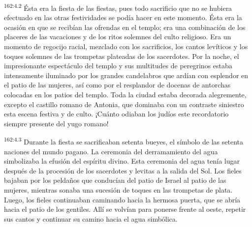 \par 
\textsuperscript{162:4.2} Ésta era la fiesta de las fiestas, pues todo sacrificio que no se hubiera efectuado en las otras festividades se podía hacer en este momento. Ésta era la ocasión en que se recibían las ofrendas en el templo; era una combinación de los placeres de las vacaciones y de los ritos solemnes del culto religioso. Era un momento de regocijo racial, mezclado con los sacrificios, los cantos levíticos y los toques solemnes de las trompetas plateadas de los sacerdotes. Por la noche, el impresionante espectáculo del templo y sus multitudes de peregrinos estaba intensamente iluminado por los grandes candelabros que ardían con esplendor en el patio de las mujeres, así como por el resplandor de docenas de antorchas colocadas en los patios del templo. Toda la ciudad estaba decorada alegremente, excepto el castillo romano de Antonia, que dominaba con un contraste siniestro esta escena festiva y de culto. ¡Cuánto odiaban los judíos este recordatorio siempre presente del yugo romano!

\par 
\textsuperscript{162:4.3} Durante la fiesta se sacrificaban setenta bueyes, el símbolo de las setenta naciones del mundo pagano. La ceremonia del derramamiento del agua simbolizaba la efusión del espíritu divino. Esta ceremonia del agua tenía lugar después de la procesión de los sacerdotes y levitas a la salida del Sol. Los fieles bajaban por los peldaños que conducían del patio de Israel al patio de las mujeres, mientras sonaba una sucesión de toques en las trompetas de plata. Luego, los fieles continuaban caminando hacia la hermosa puerta, que se abría hacia el patio de los gentiles. Allí se volvían para ponerse frente al oeste, repetir sus cantos y continuar su camino hacia el agua simbólica.

